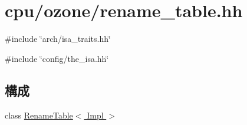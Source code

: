 \hypertarget{rename__table_8hh}{
\section{cpu/ozone/rename\_\-table.hh}
\label{rename__table_8hh}
}
{\ttfamily \#include \char`\"{}arch/isa\_\-traits.hh\char`\"{}}\par
{\ttfamily \#include \char`\"{}config/the\_\-isa.hh\char`\"{}}\par
\subsection*{構成}
\begin{DoxyCompactItemize}
\item 
class \hyperlink{classRenameTable}{RenameTable$<$ Impl $>$}
\end{DoxyCompactItemize}
